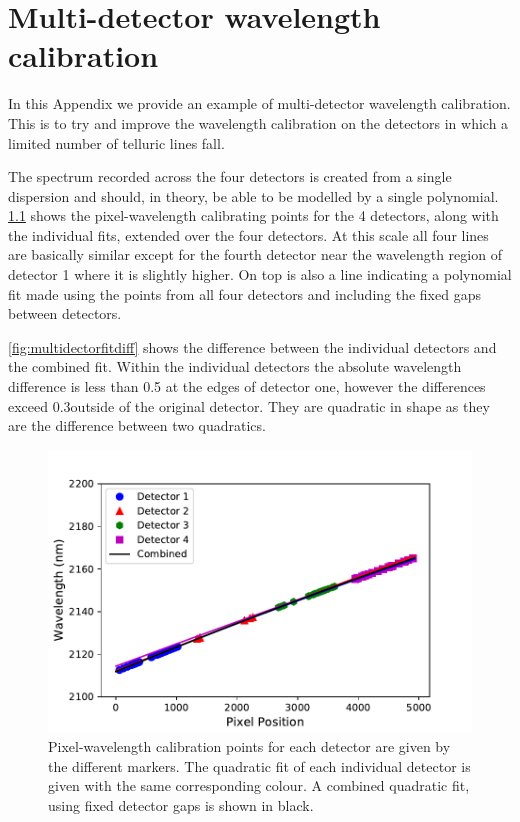
\chapter{Multi-detector wavelength calibration} %
\label{appendix:wavelength_fitting}

In this Appendix we provide an example of multi-detector wavelength calibration.
This is to try and improve the wavelength calibration on the detectors in which a limited number of telluric lines fall.

The spectrum recorded across the four detectors is created from a single dispersion and should, in theory, be able to be modelled by a single polynomial. \cref{fig:multidectorfit} shows the pixel-wavelength calibrating points for the 4 detectors, along with the individual fits, extended over the four detectors. At this scale all four lines are basically similar except for the fourth detector near  the wavelength region of detector 1 where it is slightly higher. On top is also a line indicating a polynomial fit made using the points from all four detectors and including the fixed gaps between detectors. 

\cref{fig:multidectorfitdiff} shows the difference between the individual detectors and the combined fit. Within the individual detectors the absolute wavelength difference is less than 0.5\nm{} at the edges of detector one, however the differences exceed 0.3\nm outside of the original detector. They are quadratic in shape as they are the difference between two quadratics.

\begin{figure}
    \centering
    \includegraphics[width=0.7\linewidth]{./figures/appendix/combined_wav_fit}
    \caption[Multi-detector fit and difference to individual fits.]{Pixel-wavelength calibration points for each detector are given by the different markers.
    The quadratic fit of each individual detector is given with the same corresponding colour.
    A combined quadratic fit, using fixed detector gaps is shown in black.}
    \label{fig:multidectorfit}
\end{figure}

